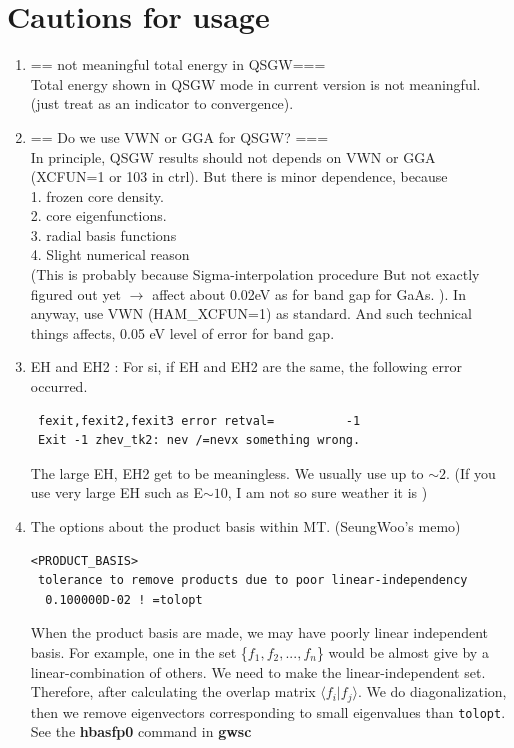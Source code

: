 {\section{Cautions for usage}
\label{cautionusage}
\begin{enumerate}
 \item == not meaningful total energy in QSGW===\\
 Total energy shown in QSGW mode in current version is not meaningful. 
(just treat as an indicator to convergence).

\item == Do we use VWN or GGA for QSGW? ===\\
  In principle, QSGW results should not depends on VWN or GGA 
  (XCFUN=1 or 103 in ctrl). But there is minor dependence, because\\
   1. frozen core density.\\
   2. core eigenfunctions.\\
   3. radial basis functions\\
   4. Slight numerical reason \\
      (This is probably because Sigma-interpolation procedure
       But not exactly figured out yet
       $\rightarrow$ affect about 0.02eV as for band gap for GaAs. ).
  In anyway, use VWN (HAM\_XCFUN=1) as standard.
  And such technical things affects, 0.05 eV level of error for band gap.

\item{EH and EH2} : For si, if EH and EH2 are the same, the following
     error occurred. 
\begin{verbatim}
 fexit,fexit2,fexit3 error retval=          -1
 Exit -1 zhev_tk2: nev /=nevx something wrong.
\end{verbatim}
     The large EH, EH2 get to be meaningless. We usually use up to 
     $\sim 2$. (If you use very large EH such as E$\sim 10$, I am not so
     sure weather it is )

\item { The options about the product basis within MT. (SeungWoo's memo)}

\begin{verbatim}
<PRODUCT_BASIS>
 tolerance to remove products due to poor linear-independency
  0.100000D-02 ! =tolopt
\end{verbatim}
When the product basis are made, we may have poorly linear independent
basis. For example, one in the set \{$f_1, f_2, ..., f_n$\} would 
be almost give by a linear-combination of others. We need to make the
      linear-independent set. Therefore, after calculating the overlap matrix 
      $\langle  f_i|f_j \rangle$. We do diagonalization, then 
      we remove eigenvectors corresponding to small eigenvalues than
      \verb+tolopt+. 
      See the {\bf hbasfp0} command in {\bf gwsc}


\end{enumerate}}
